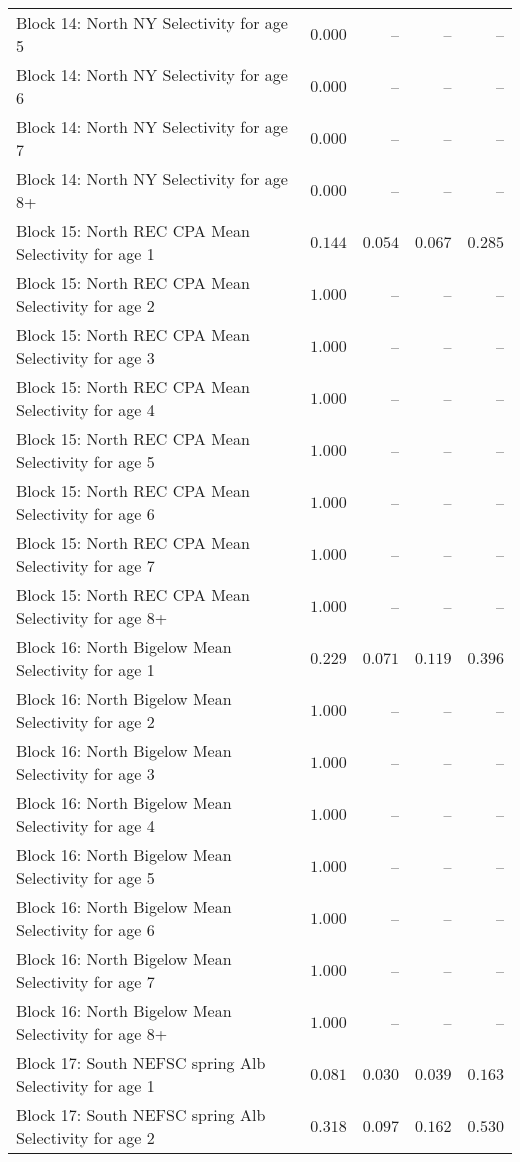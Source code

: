 \documentclass[
]{article}
\begin{document}
\begin{landscape}
\begin{longtable}[t]{lrrrr}
\addlinespace
Block 14: North NY Selectivity for age 5 & $0.000$ & -- & -- & --\\
Block 14: North NY Selectivity for age 6 & $0.000$ & -- & -- & --\\
Block 14: North NY Selectivity for age 7 & $0.000$ & -- & -- & --\\
Block 14: North NY Selectivity for age 8+ & $0.000$ & -- & -- & --\\
Block 15: North REC CPA Mean Selectivity for age 1 & $0.144$ & $0.054$ & $0.067$ & $0.285$\\
\addlinespace
Block 15: North REC CPA Mean Selectivity for age 2 & $1.000$ & -- & -- & --\\
Block 15: North REC CPA Mean Selectivity for age 3 & $1.000$ & -- & -- & --\\
Block 15: North REC CPA Mean Selectivity for age 4 & $1.000$ & -- & -- & --\\
Block 15: North REC CPA Mean Selectivity for age 5 & $1.000$ & -- & -- & --\\
Block 15: North REC CPA Mean Selectivity for age 6 & $1.000$ & -- & -- & --\\
\addlinespace
Block 15: North REC CPA Mean Selectivity for age 7 & $1.000$ & -- & -- & --\\
Block 15: North REC CPA Mean Selectivity for age 8+ & $1.000$ & -- & -- & --\\
Block 16: North Bigelow Mean Selectivity for age 1 & $0.229$ & $0.071$ & $0.119$ & $0.396$\\
Block 16: North Bigelow Mean Selectivity for age 2 & $1.000$ & -- & -- & --\\
Block 16: North Bigelow Mean Selectivity for age 3 & $1.000$ & -- & -- & --\\
\addlinespace
Block 16: North Bigelow Mean Selectivity for age 4 & $1.000$ & -- & -- & --\\
Block 16: North Bigelow Mean Selectivity for age 5 & $1.000$ & -- & -- & --\\
Block 16: North Bigelow Mean Selectivity for age 6 & $1.000$ & -- & -- & --\\
Block 16: North Bigelow Mean Selectivity for age 7 & $1.000$ & -- & -- & --\\
Block 16: North Bigelow Mean Selectivity for age 8+ & $1.000$ & -- & -- & --\\
\addlinespace
Block 17: South NEFSC spring Alb Selectivity for age 1 & $0.081$ & $0.030$ & $0.039$ & $0.163$\\
Block 17: South NEFSC spring Alb Selectivity for age 2 & $0.318$ & $0.097$ & $0.162$ & $0.530$\\

\end{longtable}
\end{landscape}
\end{document}
